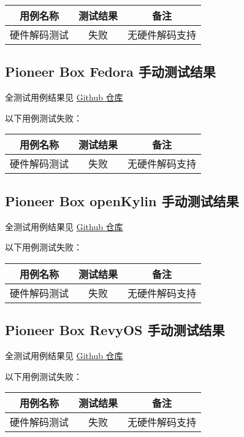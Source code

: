 \documentclass{article}
\begin{document}
\begin{table}[H]
\centering
\begin{tabular}{|c|c|c|}
\hline
\textbf{用例名称} & \textbf{测试结果} & \textbf{备注} \\ \hline
硬件解码测试 & 失败 & 无硬件解码支持 \\ \hline
\end{tabular}
\end{table}

\subsection*{Pioneer Box Fedora 手动测试结果}

全测试用例结果见 \href{https://github.com/QA-Team-lo/firefox_test/tree/main/p_fe}{Github 仓库}

以下用例测试失败：

\begin{table}[H]
\centering
\begin{tabular}{|c|c|c|}
\hline
\textbf{用例名称} & \textbf{测试结果} & \textbf{备注} \\ \hline
硬件解码测试 & 失败 & 无硬件解码支持 \\ \hline
\end{tabular}
\end{table}

\subsection*{Pioneer Box openKylin 手动测试结果}

全测试用例结果见 \href{https://github.com/QA-Team-lo/firefox_test/tree/main/p_ok}{Github 仓库}

以下用例测试失败：

\begin{table}[H]
\centering
\begin{tabular}{|c|c|c|}
\hline
\textbf{用例名称} & \textbf{测试结果} & \textbf{备注} \\ \hline
硬件解码测试 & 失败 & 无硬件解码支持 \\ \hline
\end{tabular}
\end{table}

\subsection*{Pioneer Box RevyOS 手动测试结果}

全测试用例结果见 \href{https://github.com/QA-Team-lo/firefox_test/tree/main/p_re}{Github 仓库}

以下用例测试失败：

\begin{table}[H]
\centering
\begin{tabular}{|c|c|c|}
\hline
\textbf{用例名称} & \textbf{测试结果} & \textbf{备注} \\ \hline
硬件解码测试 & 失败 & 无硬件解码支持 \\ \hline
\end{tabular}
\end{table}

\end{document}
